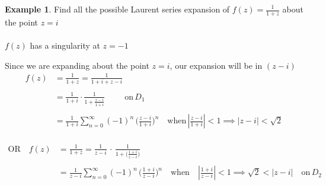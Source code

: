 \documentclass[11pt,a4paper]{article}
\theoremstyle{definition}
\newtheorem{example}[thm]{Example}
\begin{document}
\begin{example}
Find all the possible Laurent series expansion of $f(z) = \frac{1}{1 + z}$ about the point $z = i$\\

\text{\textcolor{red}{Solution}}\\
$f(z)$ has a singularity at $z = -1$



\begin{figure}[H]
\centering
{}
\end{figure}






Since we are expanding about the point $z = i$, our expansion will be in $(z - i)$
\begin{align*}
f(z)  & = \frac{1}{1 + z} = \frac{1}{1 + i + z - i}\\\\
& = \frac{1}{1 + i}\cdot \frac{1}{1 + \frac{z - i}{1 + i}}\hspace{01cm} \text{on}\, D_1\\\\
& = \frac{1}{1  + i}\sum^{\infty}_{n  = 0}(-1)^n\,\Big(\frac{z - i}{1 + i}\Big)^n\quad \text{when}\,\left|\frac{z - i}{1 + i}\right| < 1 \implies \left|z - i\right| < \sqrt{2}\\
\end{align*}




\begin{align*}
\text{OR}\quad   f(z) & = \frac{1}{1 + z} = \frac{1}{z - i}\,\cdot\, \frac{1}{1 + \Big(\frac{1 + i}{z - i}\Big)}\\\\
&  = \frac{1}{z - i}\sum^{\infty}_{n = 0}(-1)^n\,\Big(\frac{1 + i}{z - i}\Big)^n\quad \text{when}\quad \left|\frac{1 + i}{z - i}\right| < 1 \implies \sqrt{2} < \left|z - i\right|\quad \text{on}\,D_2\\\\
\end{align*}
\end{example}
\end{document}
